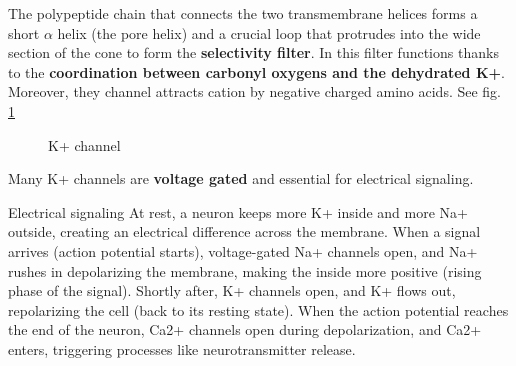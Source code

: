 \documentclass[../main.tex]{subfiles}
\begin{document}
The polypeptide chain that connects the two transmembrane helices forms a short $\alpha$ helix (the pore helix) and a crucial loop that protrudes into the wide section of the cone to form the \textbf{selectivity filter}. In this filter functions thanks to the \textbf{coordination between carbonyl oxygens and the dehydrated K+}. \\
Moreover, they channel attracts cation by negative charged amino acids. See fig. \ref{structureK+}
\begin{figure}[H]
	\centering
	\caption{K+ channel}
	\label{structureK+}
\end{figure} 
Many K+ channels are \textbf{voltage gated} and essential for electrical signaling. 
\begin{RemarkWithTitel}{Electrical signaling}
	At rest, a neuron keeps more K+ inside and more Na+ outside, creating an electrical difference across the membrane. When a signal arrives (action potential starts), voltage-gated Na+ channels open, and Na+ rushes in depolarizing the membrane, making the inside more positive (rising phase of the signal). Shortly after, K+ channels open, and K+ flows out, repolarizing the cell (back to its resting state). When the action potential reaches the end of the neuron, Ca2+ channels open during depolarization, and Ca2+ enters, triggering processes like neurotransmitter release.
\end{RemarkWithTitel}
\end{document}
